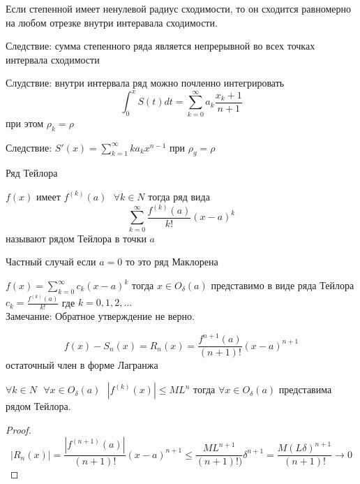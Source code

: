 \begin{theorem}
  Если степенной имеет ненулевой радиус сходимости, то он сходится равномерно
  на любом отрезке внутри интеравала сходимости.
\end{theorem}

Следствие: сумма степенного ряда является непрерывной во всех точках интервала
сходимости

Слудствие: внутри интервала ряд можно почленно интегрировать
$$
\int_0^x S(t)dt = \sum_{k=0}^{\infty} a_k \frac{x_k+1}{n+1}
$$
при этом $\rho_k = \rho$

Следствие: $S'(x) = \sum_{k=1}^{\infty}k a_k x^{n-1}$ при $\rho_g = \rho$

\begin{title}
  Ряд Тейлора
\end{title}

\begin{define}
  $f(x)$ имеет $f^{(k)}(a) ~~~ \forall k \in N$ тогда ряд вида
  $$
  \sum_{k=0}^{\infty} \frac{f^{(k)}(a)}{k!} (x-a)^k
  $$
  называют рядом Тейлора в точки $a$

  Частный случай если $a = 0$ то это ряд Маклорена
\end{define}

\begin{theorem}
  $f(x) = \sum_{k=0}^{\infty} c_k(x-a)^k$ тогда $x \in O_{\delta}(a)$
  представимо в виде ряда Тейлора
  $c_k = \frac{f^{(k)}(a)}{k!}$ где $k = 0,1,2, \ldots$ \\

  Замечание: Обратное утверждение не верно.
\end{theorem}

\begin{define}
  $$
  f(x) - S_n(x) = R_n(x) = \frac{f^{n+1}(a)}{(n+1)!} (x - a)^{n+1}
  $$
  остаточный член в форме Лагранжа
\end{define}

\begin{theorem}
  $\forall k \in N ~~~ \forall x \in O_{\delta}(a) ~~~ |f^{(k)}(x)| \le M L^n$
  тогда $\forall x \in O_{\delta}(a)$ представима рядом Тейлора.
\end{theorem}

\begin{proof}
  $$
  |R_n(x)| = \frac{| f^{(n+1)}(a) |}{(n+1)!} (x-a)^{n+1} \le
  \frac{ML^{n+1}}{(n+1)!)} \delta^{n+1} =
  \frac{ M (L\delta)^{n+1} }{(n+1)!} \to 0
  $$
\end{proof}